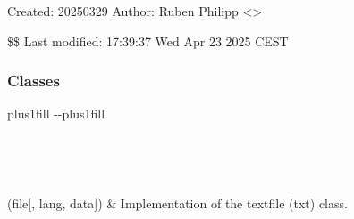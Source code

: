 \documentclass[letterpaper,10pt,english]{sphinxmanual}
\begin{document}
\sphinxAtStartPar
Created: 2025\sphinxhyphen{}03\sphinxhyphen{}29
Author: Ruben Philipp \textless{}\textgreater{}

\sphinxAtStartPar
\$\$ Last modified:  17:39:37 Wed Apr 23 2025 CEST
\subsubsection*{Classes}


\begin{savenotes}
\sphinxatlongtablestart
\sphinxthistablewithglobalstyle
\sphinxthistablewithnovlinesstyle
\makeatletter
  \LTleft \@totalleftmargin plus1fill
  \LTright\dimexpr\columnwidth-\@totalleftmargin-\linewidth\relax plus1fill
\makeatother
\begin{longtable}{}
\sphinxtoprule
\endfirsthead

\\
\sphinxtoprule
\endhead

\sphinxbottomrule
{}\\
\endfoot

\endlastfoot
\sphinxtableatstartofbodyhook

\sphinxAtStartPar
{\hyperref[\detokenize{generated/bp_text.txt:bp_text.txt.TxtFile}]{}}(file{[}, lang, data{]})
&
\sphinxAtStartPar
Implementation of the text\sphinxhyphen{}file (txt) class.
\\
\sphinxbottomrule
\end{longtable}
\sphinxtableafterendhook
\sphinxatlongtableend
\end{savenotes}
\end{document}
